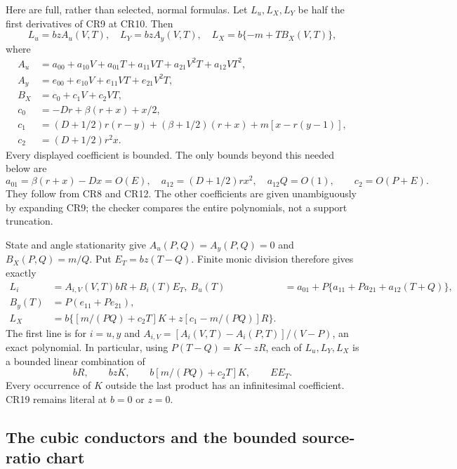 Here are full, rather than selected, normal formulas. Let $L_u,L_X,L_Y$
be half the first derivatives of CR9 at CR10. Then
\[
 L_u=bz A_u(V,T),\quad L_Y=bz A_y(V,T),\quad
 L_X=b\{-m+TB_X(V,T)\},
 \tag{CR16}
\]
where
\[
\begin{aligned}
 A_u&=a_{00}+a_{10}V+a_{01}T+a_{11}VT+a_{21}V^2T+a_{12}VT^2,\\
 A_y&=e_{00}+e_{10}V+e_{11}VT+e_{21}V^2T,\\
 B_X&=c_0+c_1V+c_2VT,\\
 c_0&=-Dr+\beta(r+x)+x/2,\\
 c_1&=(D+1/2)r(r-y)+(\beta+1/2)(r+x)
                        +m[x-r(y-1)],\\
 c_2&=(D+1/2)r^2x.
\end{aligned}\tag{CR17}
\]
Every displayed coefficient is bounded. The only bounds beyond this
needed below are
\[
 a_{01}=\beta(r+x)-Dx=O(E),\quad
 a_{12}=(D+1/2)rx^2,\quad a_{12}Q=O(1),
 \qquad c_2=O(P+E).
 \tag{CR18}
\]
They follow from CR8 and CR12. The other coefficients are given
unambiguously by expanding CR9; the checker compares the entire
polynomials, not a support truncation.

State and angle stationarity give
$A_u(P,Q)=A_y(P,Q)=0$ and $B_X(P,Q)=m/Q$.
Put $E_T=bz(T-Q)$. Finite monic division therefore gives exactly
\[
\begin{aligned}
 L_i&=A_{i,V}(V,T)bR+B_i(T)E_T,\
 B_u(T)&=a_{01}+P\{a_{11}+Pa_{21}+a_{12}(T+Q)\},\\
 B_y(T)&=P(e_{11}+Pe_{21}),\\
 L_X&=b\{[m/(PQ)+c_2T]K+z[c_1-m/(PQ)]R\}.
\end{aligned}\tag{CR19}
\]
The first line is for $i=u,y$ and
$A_{i,V}=[A_i(V,T)-A_i(P,T)]/(V-P)$, an exact polynomial.
In particular, using $P(T-Q)=K-zR$, each of $L_u,L_Y,L_X$
is a bounded linear combination of
\[
 bR,\qquad bzK,\qquad b[m/(PQ)+c_2T]K,
 \qquad E E_T.
 \tag{CR20}
\]
Every occurrence of $K$ outside the last product has an
infinitesimal coefficient. CR19 remains literal at $b=0$ or $z=0$.

\subsection{The cubic conductors and the bounded source-ratio chart}

